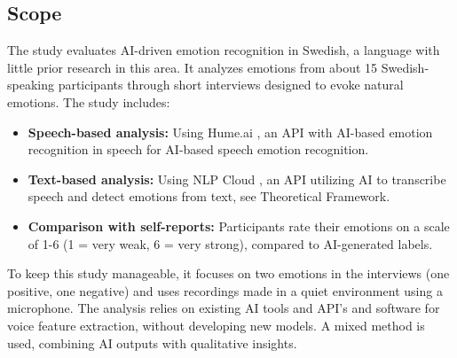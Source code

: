 \subsection{Scope}
The study evaluates AI-driven emotion recognition in Swedish, a language with little prior research in this area. It analyzes emotions from about 15 Swedish-speaking participants through short interviews designed to evoke natural emotions. The study includes: 
\begin{itemize}
    \item \textbf{Speech-based analysis:} Using Hume.ai \autocite{HumeAI-AboutHume}, an API with AI-based emotion recognition in speech for AI-based speech emotion recognition. 
    \item \textbf{Text-based analysis:} Using NLP Cloud \autocite{NLPCloud}, an API utilizing AI to transcribe speech and detect emotions from text, see Theoretical Framework. 
    \item \textbf{Comparison with self-reports:} Participants rate their emotions on a scale of 1-6 (1 = very weak, 6 = very strong), compared to AI-generated labels. 
\end{itemize}
To keep this study manageable, it focuses on two emotions in the interviews (one positive, one negative) and uses recordings made in a quiet environment using a microphone. The analysis relies on existing AI tools and API’s \autocite{HumeAI-AboutHume, NLPCloud} and software for voice feature extraction, without developing new models. A mixed method is used, combining AI outputs with qualitative insights.

